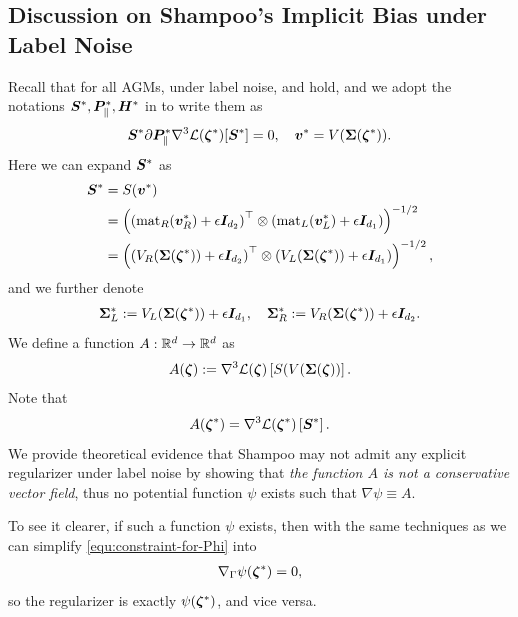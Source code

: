 \subsection{Discussion on Shampoo's Implicit Bias under Label Noise}
Recall that for all AGMs, under label noise,  and  hold, and we adopt the notations ${\bm{S}}^*,{\bm{P}}_{\parallel}^*,{\bm{H}}^* $ in  to write them as
    \begin{gather*}
        {\bm{S}}^*\partial{\bm{P}}_{\parallel}^* \nabla^3 \mathcal{L}({\bm{\zeta}}^*)[{\bm{S}}^*]=0, \quad
        {\bm{v}}^* = V({\bm{\Sigma}}({\bm{\zeta}}^*)). 
    \end{gather*}
Here we can expand ${\bm{S}}^*$ as \begin{align*}
    {\bm{S}}^* &= S({\bm{v}}^*) \\ &= \left(\left(\mathrm{mat}_R({\bm{v}}_R^*)+\epsilon {\bm{I}}_{d_2}\right)^\top \otimes \left(\mathrm{mat}_L({\bm{v}}_L^*)+\epsilon {\bm{I}}_{d_1}\right)\right)^{-1/2} \\
    &= \left(\left(V_R({\bm{\Sigma}}({\bm{\zeta}}^*))+\epsilon {\bm{I}}_{d_2}\right)^\top \otimes \left(V_L({\bm{\Sigma}}({\bm{\zeta}}^*))+\epsilon {\bm{I}}_{d_1}\right)\right)^{-1/2},
\end{align*}
and we further denote \begin{align*}
    {\bm{\Sigma}}_L^* := V_L({\bm{\Sigma}}({\bm{\zeta}}^*))+\epsilon {\bm{I}}_{d_1}, \quad 
    {\bm{\Sigma}}_R^* := V_R({\bm{\Sigma}}({\bm{\zeta}}^*))+\epsilon {\bm{I}}_{d_2}.
\end{align*}
We define a function $A: \mathbb{R}^d \rightarrow \mathbb{R}^d$ as
\begin{align*}
    A({\bm{\zeta}}) := \nabla^3 \mathcal{L}({\bm{\zeta}})\left[S(V({\bm{\Sigma}}({\bm{\zeta}}))\right].
\end{align*}
Note that \begin{align}\label{equ:S-shampoo}
    A({\bm{\zeta}}^*) = \nabla^3 \mathcal{L}({\bm{\zeta}}^*)  \left[{\bm{S}}^*\right].
\end{align}
We provide theoretical evidence that Shampoo may not admit any explicit regularizer under label noise by showing that \textit{the function $A$ is not a conservative vector field}, thus no potential function $\psi$ exists such that $\nabla \psi \equiv A$.



To see it clearer, if such a function $\psi$ exists, then with the same techniques as  we can simplify \eqref{equ:constraint-for-Phi} into
\begin{align*}
    \nabla_\Gamma \psi({\bm{\zeta}}^*) = 0,
\end{align*}
so the regularizer is exactly $\psi({\bm{\zeta}}^*)$, and vice versa.

